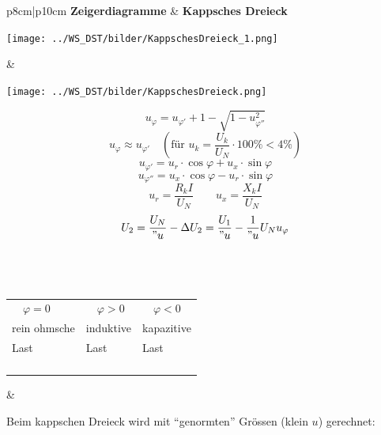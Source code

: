 			\begin{tabular}{p{8cm}|p{10cm}}
	 			\textbf{Zeigerdiagramme} & \textbf{Kappsches Dreieck}\\
				\begin{minipage}{8cm}
	            	\texttt{[image: ../WS\_DST/bilder/KappschesDreieck\_1.png]}
	            \end{minipage}  & \hspace{0.2cm}
				\begin{minipage}{10cm} 
		        	\begin{minipage}{2.5cm}
						\texttt{[image: ../WS\_DST/bilder/KappschesDreieck.png]}
		            \end{minipage}
					\begin{minipage}{7.5cm}
		      			$$u_{\varphi} = u_{\varphi'} + 1 - \sqrt{1 - u_{\varphi''}^2}$$
		      			$$ u_\varphi \approx u_{\varphi'}\quad (\text{für }u_k
		      			=\frac{U_k}{U_{N}} \cdot 100\% < 4 \%)$$
		      			$$u_{\varphi'} = u_r \cdot \cos \varphi + u_x
		      			\cdot \sin \varphi$$ $$u_{\varphi''} = u_x \cdot \cos \varphi - u_r \cdot \sin \varphi$$
		      			$$ u_r = \frac{R_k I}{U_N} \qquad u_x = \frac{X_k I}{U_N} $$
		      			$$ U_2 = \frac{U_N}{"u} - \Delta U_2 = \frac{U_1}{"u} - \frac{1}{"u}
		      			U_N u_\varphi $$\\
		      		\end{minipage}         
                \end{minipage}\\
				\begin{minipage}{8cm}
 					\begin{tabular}[c]{p{2.66cm}p{2.66cm}p{2.66cm}}
                     	$\quad \varphi = 0$ & $\quad\varphi > 0$ & $\quad\varphi
                     	< 0$\\ rein ohmsche & induktive & kapazitive\\
                     	Last & Last & Last\\
                     	&&\\
                     	&&\\
                     	&&\\
                     	&&\\
                     \end{tabular}               
                \end{minipage}& \hspace{0.2cm}
				\begin{minipage}{10cm}
		      		Beim kappschen Dreieck wird mit ``genormten'' Grössen (klein $u$) gerechnet: 

\end{minipage}
\end{tabular}
